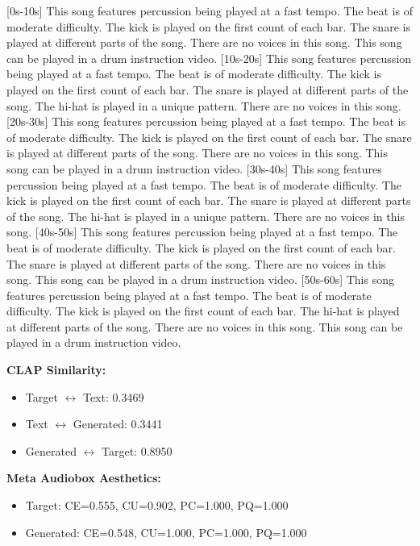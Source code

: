 \documentclass{article}
\begin{document}
\small
[0s-10s] This song features percussion being played at a fast tempo. The beat is of moderate difficulty. The kick is played on the first count of each bar. The snare is played at different parts of the song. There are no voices in this song. This song can be played in a drum instruction video. [10s-20s] This song features percussion being played at a fast tempo. The beat is of moderate difficulty. The kick is played on the first count of each bar. The snare is played at different parts of the song. The hi-hat is played in a unique pattern. There are no voices in this song. [20s-30s] This song features percussion being played at a fast tempo. The beat is of moderate difficulty. The kick is played on the first count of each bar. The snare is played at different parts of the song. There are no voices in this song. This song can be played in a drum instruction video. [30s-40s] This song features percussion being played at a fast tempo. The beat is of moderate difficulty. The kick is played on the first count of each bar. The snare is played at different parts of the song. The hi-hat is played in a unique pattern. There are no voices in this song. [40s-50s] This song features percussion being played at a fast tempo. The beat is of moderate difficulty. The kick is played on the first count of each bar. The snare is played at different parts of the song. There are no voices in this song. This song can be played in a drum instruction video. [50s-60s] This song features percussion being played at a fast tempo. The beat is of moderate difficulty. The kick is played on the first count of each bar. The hi-hat is played at different parts of the song. There are no voices in this song. This song can be played in a drum instruction video.
\normalsize

\textbf{CLAP Similarity:}
\begin{itemize}
    \item Target $\leftrightarrow$ Text: 0.3469
    \item Text $\leftrightarrow$ Generated: 0.3441
    \item Generated $\leftrightarrow$ Target: 0.8950
\end{itemize}

\textbf{Meta Audiobox Aesthetics:}
\begin{itemize}
    \item Target: CE=0.555, CU=0.902, PC=1.000, PQ=1.000
    \item Generated: CE=0.548, CU=1.000, PC=1.000, PQ=1.000
\end{itemize}
\end{document}
